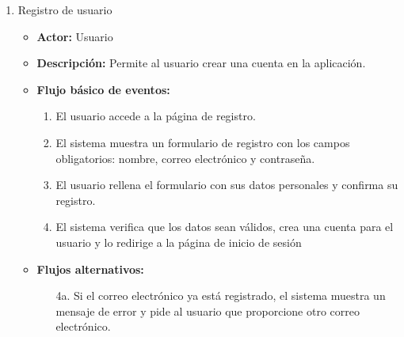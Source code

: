 \begin{enumerate}[CU-1:]
\item{Registro de usuario}
\begin{itemize}
	\item \textbf{Actor:} Usuario
	\item \textbf{Descripción:} Permite al usuario crear una cuenta en la aplicación.
	\item \textbf{Flujo básico de eventos:}
	\begin{enumerate}[1:]
		\item El usuario accede a la página de registro.
		\item El sistema muestra un formulario de registro con los campos obligatorios: nombre, correo electrónico y contraseña.
		\item El usuario rellena el formulario con sus datos personales y confirma su registro.
		\item El sistema verifica que los datos sean válidos, crea una cuenta para el usuario y lo redirige a la página de inicio de sesión
	\end{enumerate}
	\item \textbf{Flujos alternativos:}
		\begin{itemize}
		\item[4a.] Si el correo electrónico ya está registrado, el sistema muestra un mensaje de error y pide al usuario que proporcione otro correo electrónico.
		\end{itemize}
\end{itemize}


\end{enumerate}

